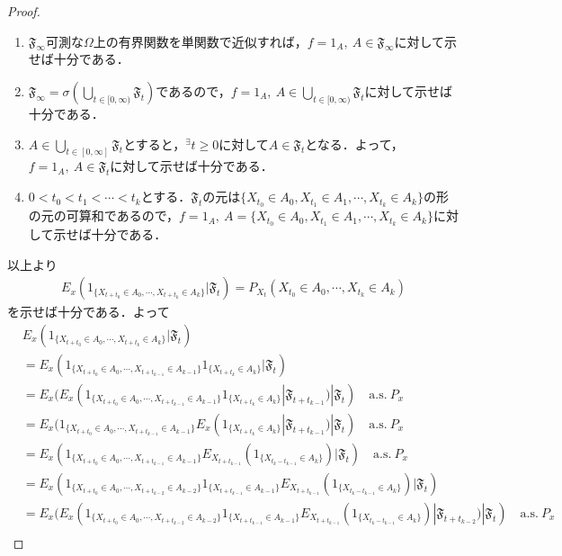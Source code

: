 \documentclass[dvipdfmx]{jsarticle}
\newtheorem{proof}{証明}
\begin{document}
\begin{proof}
\begin{enumerate}
\renewcommand{\labelenumi}{(\arabic{enumi})}
\item $\mathfrak{F}_\infty$可測な$\Omega$上の有界関数を単関数で近似すれば，$f=1_A,{\ }A\in\mathfrak{F}_\infty$に対して示せば十分である．
\item $\mathfrak{F}_{\infty}=\sigma\left(\underset{t\in [0,\infty)}{\bigcup}\mathfrak{F}_t\right)$であるので，$f=1_A,{\ }A\in\underset{t\in [0,\infty)}{\bigcup}\mathfrak{F}_t$に対して示せば十分である．
\item $A\in\underset{t\in [0,\infty]}{\bigcup}\mathfrak{F}_t$とすると，$^\exists t\geq 0$に対して$A\in \mathfrak{F}_t$となる．よって，$f=1_A,{\ }A\in\mathfrak{F}_t$に対して示せば十分である．
\item $0<t_0<t_1<\cdots<t_k$とする．$\mathfrak{F}_t$の元は$\{X_{t_0}\in A_0,X_{t_1}\in A_1,\cdots,X_{t_k}\in A_k\}$の形の元の可算和であるので，$f=1_A,{\ }A=\{X_{t_0}\in A_0,X_{t_1}\in A_1,\cdots,X_{t_k}\in A_k\}$に対して示せば十分である．
\end{enumerate}
以上より
\begin{align*}
E_x(1_{\{X_{t+t_0}\in A_0,\cdots,X_{t+t_k}\in A_k\}}|\mathfrak{F}_t)=P_{X_t}(X_{t_0}\in A_0,\cdots,X_{t_k}\in A_k)
\end{align*}
を示せば十分である．よって
\begin{align*}
&E_x(1_{\{X_{t+t_0}\in A_0,\cdots,X_{t+t_k}\in A_k\}}|\mathfrak{F}_t) \\
&=E_x(1_{\{X_{t+t_0}\in A_0,\cdots,X_{t+t_{k-1}}\in A_{k-1}\}}1_{\{X_{t+t_k}\in A_k\}}|\mathfrak{F}_t) \\
&=E_x(E_x(1_{\{X_{t+t_0}\in A_0,\cdots,X_{t+t_{k-1}}\in A_{k-1}\}}1_{\{X_{t+t_k}\in A_k\}}|\mathfrak{F}_{t+t_{k-1}})|\mathfrak{F}_t) \quad \mathrm{a.s.}{\ }P_x \\
&=E_x(1_{\{X_{t+t_0}\in A_0,\cdots,X_{t+t_{k-1}}\in A_{k-1}\}}E_x(1_{\{X_{t+t_k}\in A_k\}}|\mathfrak{F}_{t+t_{k-1}})|\mathfrak{F}_t) \quad \mathrm{a.s.}{\ }P_x \\
&=E_x(1_{\{X_{t+t_0}\in A_0,\cdots,X_{t+t_{k-1}}\in A_{k-1}\}}E_{X_{t+t_{k-1}}}(1_{\{X_{t_k-t_{k-1}}\in A_k\}})|\mathfrak{F}_t) \quad \mathrm{a.s.}{\ }P_x \\
%
&=E_x(1_{\{X_{t+t_0}\in A_0,\cdots,X_{t+t_{k-2}}\in A_{k-2}\}}1_{\{X_{t+t_{k-1}}\in A_{k-1}\}}E_{X_{t+t_{k-1}}}(1_{\{X_{t_k-t_{k-1}}\in A_k\}})|\mathfrak{F}_t) \\
&=E_x(E_x(1_{\{X_{t+t_0}\in A_0,\cdots,X_{t+t_{k-2}}\in A_{k-2}\}}1_{\{X_{t+t_{k-1}}\in A_{k-1}\}}E_{X_{t+t_{k-1}}}(1_{\{X_{t_k-t_{k-1}}\in A_k\}})|\mathfrak{F}_{t+t_{k-2}})|\mathfrak{F}_t) \quad \mathrm{a.s.}{\ }P_x \\

\end{align*}
\end{proof}
\end{document}
